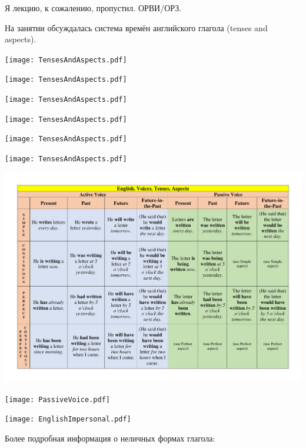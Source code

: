\documentclass[main.tex]{subfiles}
\begin{document}

Я лекцию, к сожалению, пропустил. ОРВИ/ОРЗ.

На занятии обсуждалась система времён английского глагола (tenses and aspects).

\vspace{-10mm}
{\parindent-20pt\texttt{[image: TensesAndAspects.pdf]}}\newpage

\vspace{-5mm}
{\parindent-20pt\texttt{[image: TensesAndAspects.pdf]}}\newpage

\vspace{-5mm}
{\parindent-20pt\texttt{[image: TensesAndAspects.pdf]}}\newpage

\vspace{-5mm}
{\parindent-20pt\texttt{[image: TensesAndAspects.pdf]}}\newpage

\vspace{-5mm}
{\parindent-20pt\texttt{[image: TensesAndAspects.pdf]}}\newpage

{\parindent-20pt\texttt{[image: TensesAndAspects.pdf]}}


{\parindent0pt\includegraphics[width=\textwidth,page=1,trim={0.5in 0in 0.49in 0in},clip=true]{EnglishTensesAspectsVoicesPoster.pdf}}


{\parindent-10pt\texttt{[image: PassiveVoice.pdf]}}\newpage

\label{subsec:impersonal-lk}

{\parindent0pt\texttt{[image: EnglishImpersonal.pdf]}}

Более подробная информация о неличных формах глагола: \hyperref[subsec:impersonal-forms-full-view]{\color{blue}{НЕЛИЧНЫЕ ФОРМЫ ГЛАГОЛА}}
\end{document}
